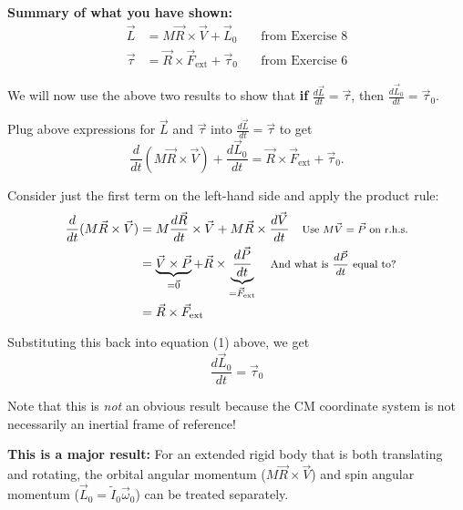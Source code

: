 \documentclass[11pt, letterpaper, openany]{book}
\newenvironment{exercise}[1][Exercise]{%
  \tcolorbox[blanker, breakable, left=1em,
    before skip=1em, after skip=1em,
    borderline west={3pt}{0pt}{PhysNavy},
    colback=PhysCream,
    before upper={\textcolor{PhysNavy}{\sffamily\bfseries #1:}\space}
  ]%
}{%
  \endtcolorbox%
}
\begin{document}
\textbf{Summary of what you have shown:}
\begin{align*}
    \vec{L} &= M\vec{R} \times \vec{V} + \vec{L}_0 \quad &\text{from Exercise 8} \\
    \vec{\tau} &= \vec{R} \times \vec{F}_{\text{ext}} + \vec{\tau}_0 \quad &\text{from Exercise 6}
\end{align*}

We will now use the above two results to show that \textbf{if} $\frac{d\vec{L}}{dt} = \vec{\tau}$, then $\frac{d\vec{L}_0}{dt} = \vec{\tau}_0$.

Plug above expressions for $\vec{L}$ and $\vec{\tau}$ into $\frac{d\vec{L}}{dt} = \vec{\tau}$ to get
\begin{equation}
    \frac{d}{dt}(M\vec{R} \times \vec{V}) + \frac{d\vec{L}_0}{dt} = \vec{R} \times \vec{F}_{\text{ext}} + \vec{\tau}_0. \tag{1}
\end{equation}

\begin{exercise}[Exercise 9]
Consider just the first term on the left-hand side and apply the product rule: \\
\textcolor{blue}{
\begin{align*}
    \frac{d}{dt}(M\vec{R} \times \vec{V}) &= M\frac{d\vec{R}}{dt} \times \vec{V} + M\vec{R} \times \frac{d\vec{V}}{dt} \quad \text{\footnotesize{Use $M\vec{V} = \vec{P}$ on r.h.s.}} \\
    &= \underbrace{\vec{V} \times \vec{P}}_{=\vec{0}} + \vec{R} \times \underbrace{\frac{d\vec{P}}{dt}}_{= \vec{F}_{\text{ext}}} \quad \text{\footnotesize{And what is $\frac{d\vec{P}}{dt}$ equal to?}} \\
    &= \vec{R} \times \vec{F}_{\text{ext}}
\end{align*}
}
\end{exercise}

Substituting this back into equation (1) above, we get
\[ \boxed{\frac{d\vec{L}_0}{dt} = \vec{\tau}_0} \]

Note that this is \textit{not} an obvious result because the CM coordinate system is not necessarily an inertial frame of reference!

\textbf{This is a major result:} For an extended rigid body that is both translating and rotating, the orbital angular momentum ($M\vec{R} \times \vec{V}$) and spin angular momentum ($\vec{L}_0 = \tilde{I}_0\vec{\omega}_0$) can be treated separately.
\end{document}
